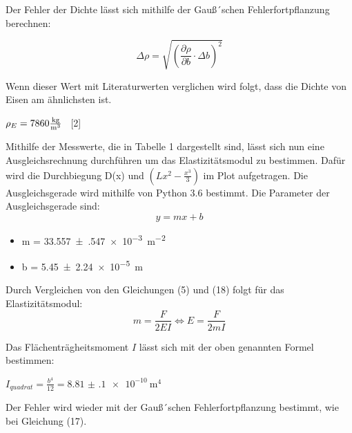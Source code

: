 Der Fehler der Dichte lässt sich mithilfe der Gauß´schen Fehlerfortpflanzung berechnen:

\begin{equation}
  \Delta \rho = \sqrt{\left(\frac{\partial\rho}{\partial b} \cdot \Delta b \right)^2}
\end{equation}

Wenn dieser Wert mit Literaturwerten verglichen wird folgt, dass die Dichte von Eisen
am ähnlichsten ist.\\
\centerline{$\rho_{E} = 7860 \si[per-mode=fraction]{\kilo\gram\per\metre\tothe{3}}$ \, [2]}


Mithilfe der Messwerte, die in Tabelle 1 dargestellt sind, lässt sich nun eine
Ausgleichsrechnung durchführen um das Elastizitätsmodul zu bestimmen. Dafür wird die
Durchbiegung D(x) und $\left( Lx^2- \frac{x^3}{3} \right)$ im Plot aufgetragen.
Die Ausgleichsgerade wird mithilfe von Python 3.6 bestimmt.
Die Parameter der Ausgleichsgerade sind:\\

\begin{equation}
  y=mx+b
\end{equation}

\begin{itemize}
  \item m = \SI{33.557(547)e-3}{\meter\tothe{-2}}
  \item b = \SI{5.45(224)e-5}{\meter}
\end{itemize}

Durch Vergleichen von den Gleichungen (5) und (18) folgt für das Elastizitätsmodul:\\

\begin{equation}
  m = \frac{F}{2EI} \iff E= \frac{F}{2mI}
\end{equation}

Das Flächenträgheitsmoment $I$ lässt sich mit der oben genannten Formel bestimmen:\\

\centerline{$I_{quadrat} = \frac{b^4}{12} = \SI{8.81(10)e-10}{\meter\tothe{4}}$}

Der Fehler wird wieder mit der Gauß´schen Fehlerfortpflanzung bestimmt, wie bei Gleichung (17).\\

